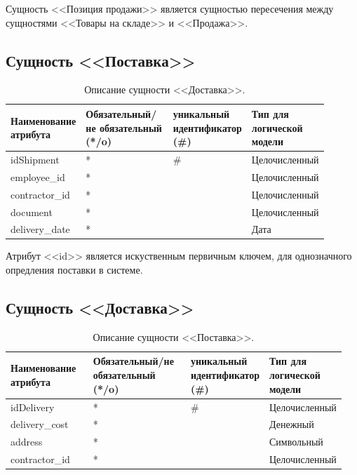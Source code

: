 \documentclass[14pt]{extreport}
\begin{document}
        Сущность <<Позиция продажи>> является сущностью пересечения между сущностями <<Товары на складе>> и <<Продажа>>.


    \subsection*{Сущность <<Поставка>>}

        \begin{table}[H]
            \begin{tabular}{|p{0.2\linewidth}|p{0.3\linewidth}|p{0.2\linewidth}|p{0.2\linewidth}|}
                \hline
                Наименование атрибута & Обязательный/не обязательный (*/o) & уникальный идентификатор (\#) & Тип для логической модели
                \\ \hline
                idShipment & * & \# & Целочисленный \\ \hline
                employee\_id & * & & Целочисленный\\ \hline
                contractor\_id & * & & Целочисленный \\ \hline
                document & * & & Целочисленный \\ \hline
                delivery\_date & * & & Дата \\ \hline
            \end{tabular}
            \caption{Описание сущности <<Доставка>>.}
        \end{table}

        Атрибут <<id>> является искуственным первичным ключем, для однозначного опредления поставки в системе.%

    
    \subsection*{Сущность <<Доставка>>}

        \begin{table}[H]
            \begin{tabular}{|p{0.25\linewidth}|p{0.3\linewidth}|p{0.2\linewidth}|p{0.2\linewidth}|}
                \hline
                Наименование атрибута & Обязательный/не обязательный (*/o) & уникальный идентификатор (\#) & Тип для логической модели
                \\ \hline
                idDelivery & * & \# & Целочисленный \\ \hline
                delivery\_cost & * & & Денежный\\ \hline
                address & * & & Символьный \\ \hline
                contractor\_id & * & & Целочисленный \\ \hline
            \end{tabular}
            \caption{Описание сущности <<Поставка>>.}
        \end{table}
\end{document}
